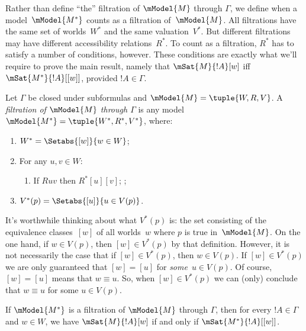 \documentclass[../../../include/open-logic-section]{subfiles}
\begin{document}

Rather than define ``the'' filtration of $\mModel{M}$ through
$\Gamma$, we define when a model~$\mModel{M^*}$ counts as a filtration
of~$\mModel{M}$. All filtrations have the same set of worlds~$W^*$ and
the same valuation~$V^*$. But different filtrations may have different
accessibility relations~$R^*$. To count as a filtration, $R^*$ has to
satisfy a number of conditions, however. These conditions are exactly
what we'll require to prove the main result, namely that
$\mSat{M}{!A}[w]$ iff $\mSat{M^*}{!A}[{[w]}]$, provided $!A \in
\Gamma$.

\begin{defn}
  Let $\Gamma$ be closed under subformulas and $\mModel{M} = \tuple{W,
    R, V}$. A \emph{filtration of $\mModel{M}$ through $\Gamma$} is
  any model $\mModel{M^*} = \tuple{W^*,R^*,V^*}$, where:
  \begin{enumerate}
  \item $W^* = \Setabs{[w]}{w \in W}$;
  \item {}%
    For any $u,v \in W$:
    \begin{enumerate}
    \item {}%
      If $Ruv$ then $R^*[u][v]$;
    ;
    \end{enumerate}
  \item $V^*(p) = \Setabs{[u]}{u \in V(p)}$.
  \end{enumerate}
\end{defn}

It's worthwhile thinking about what $V^*(p)$ is: the set consisting of
the equivalence classes~$[w]$ of all worlds~$w$ where $p$ is true
in~$\mModel{M}$. On the one hand, if $w \in V(p)$, then $[w] \in
V^*(p)$ by that definition. However, it is not necessarily the case
that if $[w] \in V^*(p)$, then $w \in V(p)$. If $[w] \in V^*(p)$ we
are only guaranteed that $[w] = [u]$ for \emph{some}~$u \in V(p)$. Of
course, $[w] = [u]$ means that $w \equiv u$.  So, when $[w] \in
V^*(p)$ we can (only) conclude that $w \equiv u$ for some $u \in
V(p)$.

\begin{thm}
  If $\mModel{M^*}$ is a filtration of $\mModel{M}$ through $\Gamma$,
  then for every $!A \in \Gamma$ and $w \in W$, we have
  $\mSat{M}{!A}[w]$ if and only if $\mSat{M^*}{!A}[{[w]}]$.
\end{thm}
\end{document}
